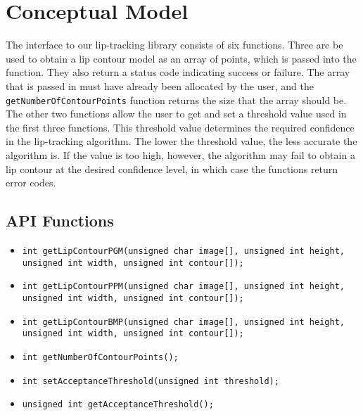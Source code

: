 \chapter{Conceptual Model}

The interface to our lip-tracking library consists of six functions. Three are be used to obtain a lip contour model as an array of points, which is passed into the function. They also return a status code indicating success or failure. The array that is passed in must have already been allocated by the user, and the \texttt{getNumberOfContourPoints} function returns the size that the array should be. The other two functions allow the user to get and set a threshold value used in the first three functions. This threshold value determines the required confidence in the lip-tracking algorithm. The lower the threshold value, the less accurate the algorithm is. If the value is too high, however, the algorithm may fail to obtain a lip contour at the desired confidence level, in which case the functions return error codes.

\section{API Functions}
\begin{itemize}
\item \texttt{int getLipContourPGM(unsigned char image[], unsigned int height, unsigned int width, unsigned int contour[]);}
\item \texttt{int getLipContourPPM(unsigned char image[], unsigned int height, unsigned int width, unsigned int contour[]);}
\item \texttt{int getLipContourBMP(unsigned char image[], unsigned int height, unsigned int width, unsigned int contour[]);}
\item \texttt{int getNumberOfContourPoints();}
\item \texttt{int setAcceptanceThreshold(unsigned int threshold);}
\item \texttt{unsigned int getAcceptanceThreshold();}
\end{itemize}